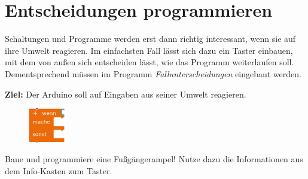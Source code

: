 \newpage
\nopagecolor
\section{Entscheidungen programmieren}
\label{sec:entscheidungen}

Schaltungen und Programme werden erst dann richtig interessant, wenn sie auf ihre Umwelt reagieren. Im einfachsten Fall lässt sich dazu ein Taster einbauen, mit dem von außen sich entscheiden lässt, wie das Programm weiterlaufen soll. Dementsprechend müssen im Programm \emph{Fallunterscheidungen} eingebaut werden.

\begin{ziel}
	\textbf{Ziel:} Der Arduino soll auf Eingaben aus seiner Umwelt reagieren.
\end{ziel}

\bigskip
\begin{projekt}[Fußgängerampel]\label{proj:fussampel}
	\begin{figure}
		\centering
		\vspace{-2\baselineskip}
		\includegraphics[width=0.15\textwidth]{./pics/wenn-mache-sonst.png}
		\label{abb:falls-dann}
	\end{figure}
	Baue und programmiere eine Fußgängerampel! Nutze dazu die Informationen aus dem Info-Kasten zum Taster.
\end{projekt}

